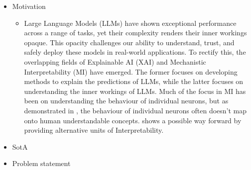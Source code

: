 \documentclass[../main.tex]{subfiles}
\begin{document}
\begin{itemize}
    \item Motivation
    \begin{itemize}
        \item Large Language Models (LLMs) have shown exceptional performance across a range of tasks, yet their complexity renders their inner workings opaque.
        This opacity challenges our ability to understand, trust, and safely deploy these models in real-world applications.
        To rectify this, the overlapping fields of Explainable AI (XAI) and Mechanistic Interpretability (MI) have emerged.
        The former focuses on developing methods to explain the predictions of LLMs, while the latter focuses on understanding the inner workings of LLMs.
        Much of the focus in MI has been on understanding the behaviour of individual neurons, but as demonstrated in \citet{elhage_toy_2022}, the behaviour of individual neurons often doesn't map onto human understandable concepts.
        \citet{bricken_towards_2023} shows a possible way forward by providing alternative units of Interpretability. 
    \end{itemize}
    \item SotA
    \item Problem statement
\end{itemize}

\subbib
\end{document}
